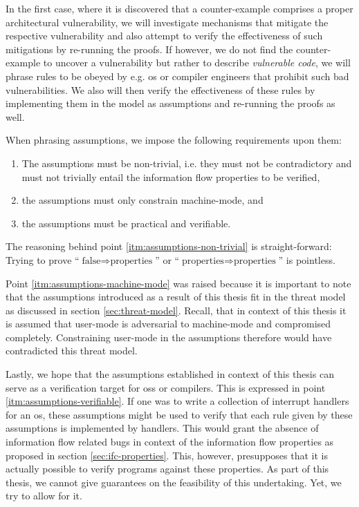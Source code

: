 In the first case, where it is discovered that a counter-example comprises a proper architectural vulnerability, we will investigate mechanisms that mitigate the respective vulnerability and also attempt to verify the effectiveness of such mitigations by re-running the proofs.
If however, we do not find the counter-example to uncover a vulnerability but rather to describe \textit{vulnerable code}, we will phrase rules to be obeyed by e.g. \gls{os} or compiler engineers that prohibit such bad vulnerabilities.
We also will then verify the effectiveness of these rules by implementing them in the model as assumptions and re-running the proofs as well.

When phrasing assumptions, we impose the following requirements upon them:
\begin{enumerate}
    \item \label{itm:assumptions-non-trivial}
    The assumptions must be non-trivial, i.e. they must not be contradictory and must not trivially entail the information flow properties to be verified,
    \item \label{itm:assumptions-machine-mode}
    the assumptions must only constrain machine-mode, and
    \item \label{itm:assumptions-verifiable}
    the assumptions must be practical and verifiable.
\end{enumerate}

The reasoning behind point \ref{itm:assumptions-non-trivial} is straight-forward:
Trying to prove \enquote{$ \text{false} \Rightarrow \text{properties} $} or \enquote{$ \text{properties} \Rightarrow \text{properties} $} is pointless.

Point \ref{itm:assumptions-machine-mode} was raised because it is important to note that the assumptions introduced as a result of this thesis fit in the threat model as discussed in section \ref{sec:threat-model}.
Recall, that in context of this thesis it is assumed that user-mode is adversarial to machine-mode and compromised completely.
Constraining user-mode in the assumptions therefore would have contradicted this threat model.

Lastly, we hope that the assumptions established in context of this thesis can serve as a verification target for \glspl{os} or compilers.
This is expressed in point \ref{itm:assumptions-verifiable}.
If one was to write a collection of interrupt handlers for an \gls{os}, these assumptions might be used to verify that each rule given by these assumptions is implemented by handlers.
This would grant the absence of information flow related bugs in context of the information flow properties as proposed in section \ref{sec:ifc-properties}.
This, however, presupposes that it is actually possible to verify programs against these properties.
As part of this thesis, we cannot give guarantees on the feasibility of this undertaking.
Yet, we try to allow for it.

